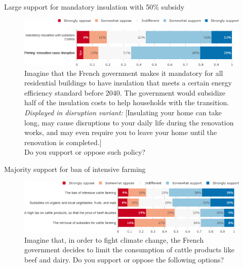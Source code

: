 \begin{framefont}{\small}
\begin{frame}{Large support for mandatory insulation with 50\% subsidy}%
\vspace{-.5cm}
\begin{figure}[h!]
\caption{Imagine that the French government makes it mandatory for all residential buildings to have insulation that meets a certain energy efficiency standard before 2040. The government would subsidize half of the insulation costs to help households with the transition. \\ %
\textit{Displayed in disruption variant:} [Insulating your home can take long, may cause disruptions to your daily life during the renovation works, and may even require you to leave your home until the renovation is completed.]  \\
Do you support or oppose such policy? }
\includegraphics[width=.85\paperwidth]{../figures/FR/insulation_support_variant_FR.png} 
\end{figure}
\end{frame}

\begin{frame}{Majority support for ban of intensive farming}%
\vspace{-.5cm}
\begin{figure}[h!]
\caption{Imagine that, in order to fight climate change, the French government decides to limit the consumption of cattle products like beef and dairy.
Do you support or oppose the following options?}
\includegraphics[width=.87\paperwidth]{../figures/FR/beef_FR.png} 
\end{figure}
\end{frame}



\end{framefont}
